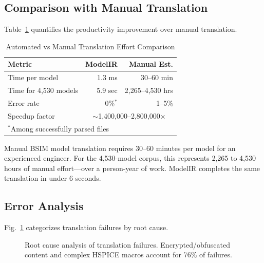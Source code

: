 \documentclass[conference]{IEEEtran}
\begin{document}
\subsection{Comparison with Manual Translation}

Table~\ref{tab:manual_comparison} quantifies the productivity improvement over manual translation.

\begin{table}[!t]
\caption{Automated vs Manual Translation Effort Comparison}
\label{tab:manual_comparison}
\centering
\renewcommand{\arraystretch}{1.15}
\begin{tabular}{@{}lrr@{}}
\toprule
\textbf{Metric} & \textbf{ModelIR} & \textbf{Manual Est.} \\
\midrule
Time per model & 1.3 ms & 30--60 min \\
Time for 4,530 models & 5.9 sec & 2,265--4,530 hrs \\
Error rate & 0\%$^*$ & 1--5\% \\
Speedup factor & \multicolumn{2}{c}{$\sim$1,400,000--2,800,000$\times$} \\
\midrule
\multicolumn{3}{l}{\footnotesize $^*$Among successfully parsed files}\\
\bottomrule
\end{tabular}
\end{table}

Manual BSIM model translation requires 30--60 minutes per model for an experienced engineer. For the 4,530-model corpus, this represents 2,265 to 4,530 hours of manual effort---over a person-year of work. ModelIR completes the same translation in under 6 seconds.

\subsection{Error Analysis}

Fig.~\ref{fig:error_breakdown} categorizes translation failures by root cause.

\begin{figure}[!t]
\centering
{}
\caption{Root cause analysis of translation failures. Encrypted/obfuscated content and complex HSPICE macros account for 76\% of failures.}
\label{fig:error_breakdown}
\end{figure}
\end{document}
